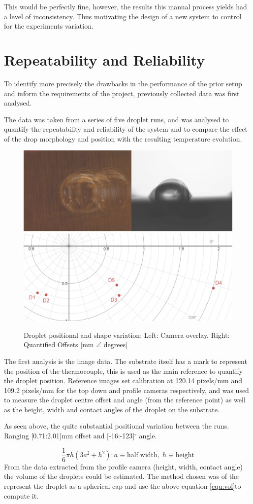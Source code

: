 This would be perfectly fine, however, the results this manual process yields had a level of inconsistency. Thus motivating the design of a new system to control for the experiments variation.

\section{Repeatability and Reliability}
To identify more precisely the drawbacks in the performance of the prior setup and inform the requirements of the project, previously collected data was first analysed.

The data was taken from a series of five droplet runs, and was analysed to quantify the repeatability and reliability of the system and to compare the effect of the drop morphology and position with the resulting temperature evolution.

\begin{figure}[h]
    \centering
    \includegraphics[width=.4\textwidth]{img/droplets_2018.png}
    \includegraphics[width=.4\textwidth]{img/drop_pos_2018.png}
    \caption{Droplet positional and shape variation; Left: Camera overlay, Right: Quantified Offsets [mm $\angle$ degrees]}
    \label{fig:init_pos}
\end{figure}

The first analysis is the image data. The substrate itself has a mark to represent the position of the thermocouple, this is used as the main reference to quantify the droplet position. Reference images set calibration at 120.14 pixels/mm and 109.2 pixels/mm for the top down and profile cameras respectively, and was used to measure the droplet centre offset and angle (from the reference point) as well as the height, width and contact angles of the droplet on the substrate.

As seen above, the quite substantial positional variation between the runs. Ranging [0.71:2.01]mm offset and [-16:-123]$^\circ$ angle.


\begin{equation}
    \frac{1}{6}\pi h(3a^2 + h^2)
    : a \equiv \mathrm{half \; width}, \; h \equiv \mathrm{height}
    \label{equ:vol}
\end{equation}
From the data extracted from the profile camera (height, width, contact angle) the volume of the droplets could be estimated. The method chosen was of the represent the droplet as a spherical cap and use the above equation \ref{equ:vol}to compute it.

